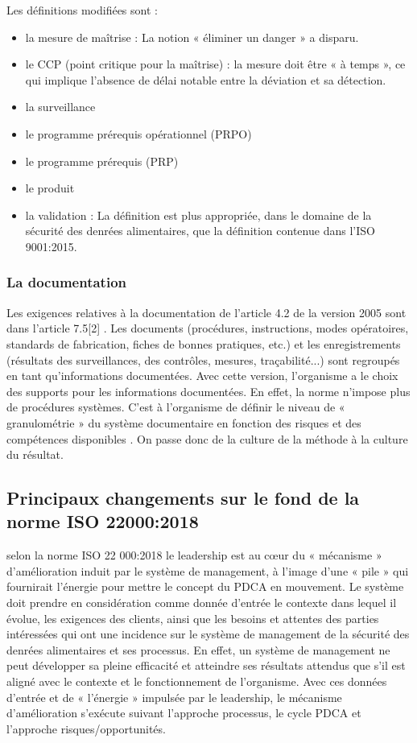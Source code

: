 \begin{spacing}{1.2}
Les définitions modifiées sont :


\begin{itemize}
	\item  la mesure de maîtrise : La notion « éliminer un danger » a disparu.
	\item  le CCP (point critique pour la maîtrise) : la mesure doit être « à temps », ce qui implique l’absence de délai notable entre la déviation et sa détection.
	\item la surveillance
	\item  le programme prérequis opérationnel (PRPO)
	\item  le programme prérequis (PRP)
	\item  le produit
	\item  la validation : La définition est plus appropriée, dans le domaine de la sécurité des denrées alimentaires, que la définition contenue dans l’ISO 9001:2015.
\end{itemize}

\subsubsection{ La documentation }
Les exigences relatives à la documentation de l’article 4.2 de la version 2005 sont dans l’article 7.5[2] . Les documents (procédures, instructions, modes opératoires, standards de fabrication, fiches de bonnes pratiques, etc.) et les enregistrements (résultats des surveillances, des contrôles, mesures, traçabilité...) sont regroupés en tant qu’informations documentées. Avec cette version, l’organisme a le choix des supports pour les informations documentées. En effet, la norme n’impose plus de procédures systèmes. C’est à l’organisme de définir le niveau de « granulométrie » du système documentaire en fonction des risques et des compétences disponibles . On passe donc de la culture de la méthode à la culture du résultat.
\subsection{ Principaux changements sur le fond de la norme ISO 22000:2018 }

selon la norme ISO 22 000:2018  le leadership est au cœur  du  « mécanisme » d’amélioration induit par le système de management, à l’image d’une « pile » qui fournirait l’énergie pour mettre le concept du PDCA en mouvement.
Le système doit prendre en considération comme donnée d’entrée le contexte dans lequel il évolue, les exigences des clients, ainsi que les besoins et attentes des parties intéressées qui ont une incidence sur le système de management de la sécurité des denrées alimentaires et ses processus. En effet, un système de management ne peut développer sa pleine efficacité et atteindre ses résultats attendus que s’il est aligné avec le contexte et le fonctionnement de l’organisme.
Avec ces données d’entrée et de « l’énergie » impulsée par le leadership, le mécanisme d’amélioration s’exécute suivant l’approche processus, le cycle PDCA et l’approche risques/opportunités.



\end{spacing}
